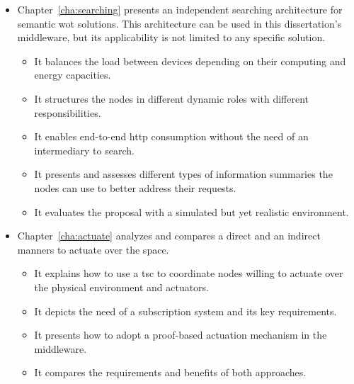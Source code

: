 \begin{itemize}
  \item Chapter~\ref{cha:searching} presents an independent searching architecture for semantic \ac{wot} solutions.
        This architecture can be used in this dissertation's middleware, but its applicability is not limited to any specific solution.
    \begin{itemize}
      \item It balances the load between devices depending on their computing and energy capacities.
      \item It structures the nodes in different dynamic roles with different responsibilities. %
      \item It enables end-to-end \ac{http} consumption without the need of an intermediary to search. %
      \item It presents and assesses different types of information summaries the nodes can use to better address their requests.
      \item It evaluates the proposal with a simulated but yet realistic environment.
    \end{itemize}
    
  \item Chapter~\ref{cha:actuate} analyzes and compares a direct and an indirect manners to actuate over the space.
    \begin{itemize}
      \item It explains how to use a \ac{tsc} to coordinate nodes willing to actuate over the physical environment and actuators.
      \item It depicts the need of a subscription system and its key requirements.
      \item It presents how to adopt a proof-based actuation mechanism in the middleware.
      \item It compares the requirements and benefits of both approaches.
    \end{itemize}
  

\end{itemize}
